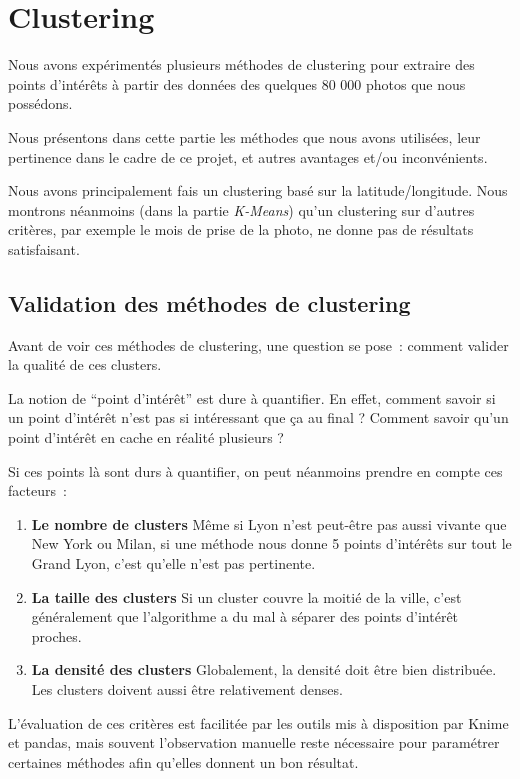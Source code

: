 \chapter{Clustering}

Nous avons expérimentés plusieurs méthodes de clustering pour extraire des points d’intérêts à partir des données
des quelques 80 000 photos que nous possédons.

Nous présentons dans cette partie les méthodes que nous avons utilisées, leur pertinence dans le cadre de ce projet, et
autres avantages et/ou inconvénients.

Nous avons principalement fais un clustering basé sur la latitude/longitude. Nous montrons néanmoins (dans la partie \textit{K-Means}) qu'un clustering sur d'autres critères, par exemple le mois de prise de la photo, ne donne pas de résultats satisfaisant.

\section{Validation des méthodes de clustering}
    Avant de voir ces méthodes de clustering, une question se pose~: comment valider la qualité de ces clusters.

    La notion de ``point d’intérêt'' est dure à quantifier. En effet, comment savoir si un point d’intérêt n'est pas si
    intéressant que ça au final ? Comment savoir qu'un point d’intérêt en cache en réalité plusieurs ?

    Si ces points là sont durs à quantifier, on peut néanmoins prendre en compte ces facteurs~:

    \begin{enumerate}
        \item \textbf{Le nombre de clusters} Même si Lyon n'est peut-être pas aussi vivante que New York ou Milan, si
        une méthode nous donne 5 points d’intérêts sur tout le Grand Lyon, c'est qu'elle n'est pas pertinente.
        \item \textbf{La taille des clusters} Si un cluster couvre la moitié de la ville, c'est généralement que l'algorithme
        a du mal à séparer des points d’intérêt proches.
        \item \textbf{La densité des clusters} Globalement, la densité doit être bien distribuée. Les clusters
        doivent aussi être relativement denses.
    \end{enumerate}

    L'évaluation de ces critères est facilitée par les outils mis à disposition par Knime et pandas, mais souvent l'observation
    manuelle reste nécessaire pour paramétrer certaines méthodes afin qu'elles donnent un bon résultat.


